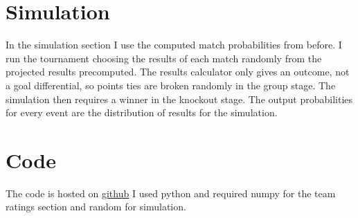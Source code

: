 \documentclass[twoside]{article}
\begin{document}
\begin{multicols}{2}
\section{Simulation}
In the simulation section I use the computed match probabilities from before. I run the
tournament choosing the results of each match randomly from the projected results precomputed.
The results calculator only gives an outcome, not a goal differential, so points ties are
broken randomly in the group stage. The simulation then requires a winner in the knockout stage.
The output probabilities for every event are the distribution of results for the simulation.

\section{Code}
The code is hosted on \href{https://github.com/brittcyr/finna-be-octo-computing-machine}{github}
I used python and required numpy for the team ratings section and random for simulation.


\end{multicols}
\end{document}
